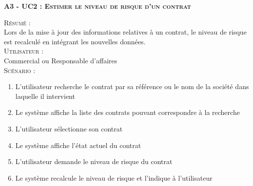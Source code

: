 \noindent\textsc{\bf{A3 - UC2 :} Estimer le niveau de risque d’un contrat}
\begin{shaded}
\noindent\textsc{Résumé :}\\

Lors de la mise à jour des informations relatives à un contrat, le niveau de risque est recalculé en intégrant les nouvelles données. \\

\noindent\textsc{Utilisateur :} \\

Commercial ou Responsable d’affaires \\

\noindent\textsc{Scénario :} \\
\begin{enumerate}
    \item L’utilisateur recherche le contrat par sa référence ou le nom de la société dans laquelle il intervient
    \item Le système affiche la liste des contrats pouvant correspondre à la recherche
    \item L’utilisateur sélectionne son contrat
    \item Le système affiche l’état actuel du contrat
    \item L’utilisateur demande le niveau de risque du contrat
    \item Le système recalcule le niveau de risque et l’indique à l’utilisateur
\end{enumerate}
\end{shaded}

